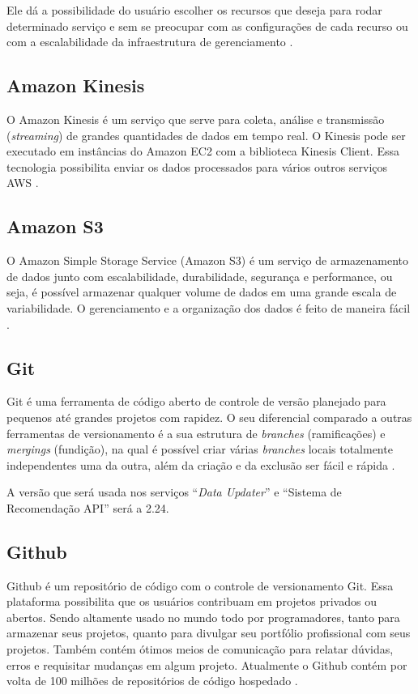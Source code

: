 Ele dá a possibilidade do usuário escolher os recursos que deseja para rodar determinado serviço e sem se preocupar com as configurações de cada recurso ou com a escalabilidade da infraestrutura de gerenciamento \cite{amazonECS:2019}.

\subsection{Amazon Kinesis}

O Amazon Kinesis é um serviço que serve para coleta, análise e transmissão (\textit{streaming}) de grandes quantidades de dados em tempo real. O Kinesis pode ser executado em instâncias do Amazon EC2 com a biblioteca Kinesis Client. Essa tecnologia possibilita enviar os dados processados para vários outros serviços AWS \cite{KINESIS:2019}.

\subsection{Amazon S3}

O  Amazon Simple Storage Service (Amazon S3) é um serviço de armazenamento de dados junto com escalabilidade, durabilidade, segurança e performance, ou seja, é possível armazenar qualquer volume de dados em uma grande escala de variabilidade. O gerenciamento e a organização dos dados é feito de maneira fácil \cite{S3:2019}.

\subsection{Git}

Git é uma ferramenta de código aberto de controle de versão planejado para pequenos até grandes projetos com rapidez. O seu diferencial comparado a outras ferramentas de versionamento é a sua estrutura de \textit{branches} (ramificações) e \textit{mergings} (fundição), na qual é possível criar várias \textit{branches} locais totalmente independentes uma da outra, além da criação e da exclusão ser fácil e rápida \cite{git:2019}.

A versão que será usada nos serviços “\textit{Data Updater}” e “Sistema de Recomendação API” será a 2.24.

\subsection{Github}

Github é um repositório de código com o controle de versionamento Git. Essa plataforma possibilita que os usuários contribuam em projetos privados ou abertos. Sendo altamente usado no mundo todo  por programadores, tanto para armazenar seus projetos, quanto para divulgar seu portfólio profissional com seus projetos. Também contém ótimos meios de comunicação para relatar dúvidas, erros e requisitar mudanças em algum projeto. Atualmente o Github contém por volta de 100 milhões de repositórios de código hospedado \cite{github:2019}.

